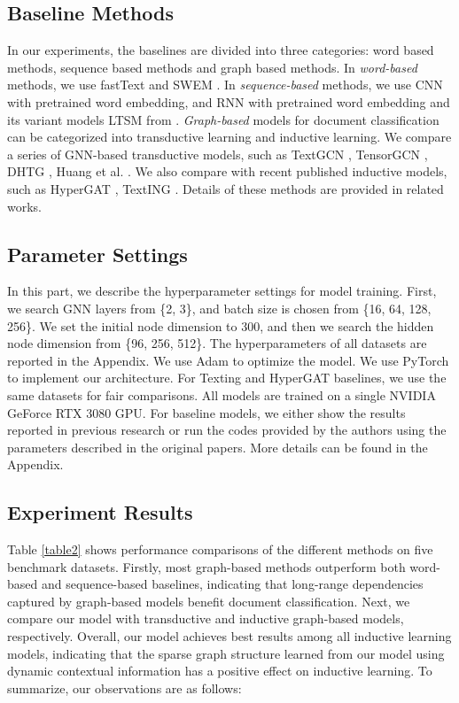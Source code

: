 \documentclass[letterpaper]{article} %
\begin{document}
\subsection{Baseline Methods}
In our experiments, the baselines are divided into three categories: word based methods, sequence based methods and graph based methods. In \textit{word-based} methods, we use fastText \cite{joulin2017bag} and SWEM \cite{shen2018baseline}. 
In \textit{sequence-based} methods, we use CNN \cite{kim-2014-convolutional} with pretrained word embedding, and RNN \cite{liu2016recurrent} with pretrained word embedding and its variant models LTSM from \cite{yao2019graph}. \textit{Graph-based} models for document classification can be categorized into transductive learning and inductive learning. We compare a series of GNN-based transductive models, such as TextGCN \cite{yao2019graph}, TensorGCN  \cite{liu2020tensor}, DHTG \cite{wang2020learning}, Huang et al. \cite{huang2019text}. We also compare with recent published inductive models, such as HyperGAT \cite{ding2020more}, TextING \cite{zhang2020every}. Details of these methods are provided in related works.

\subsection{Parameter Settings}
In this part, we describe the hyperparameter settings for model training. First, we search GNN layers from \{2, 3\}, and batch size is chosen from \{16, 64, 128, 256\}. We set the initial node dimension to 300, and then we search the hidden node dimension from \{96, 256, 512\}. The hyperparameters of all datasets are reported in the Appendix. We use Adam \cite{kingma2015adam} to optimize the model. We use PyTorch \cite{paszke2019pytorch} to implement our architecture. For Texting and HyperGAT baselines, we use the same datasets for fair comparisons. All models are trained on a single NVIDIA GeForce RTX 3080 GPU. For baseline models, we either show the results reported in previous research \cite{yao2019graph} or run the codes provided by the authors using the parameters described in the original papers. More details can be found in the Appendix.
\subsection{Experiment Results}
Table \ref{table2} shows performance comparisons of the different methods on five benchmark datasets. Firstly, most graph-based methods outperform both word-based and sequence-based baselines, indicating that long-range dependencies captured by graph-based models benefit document classification.
Next, we compare our model with transductive and inductive graph-based models, respectively. Overall, our model achieves best results among all inductive learning models, indicating that the sparse graph structure learned from our model using dynamic contextual information has a positive effect on inductive learning.
To summarize, our observations are as follows:
\end{document}
